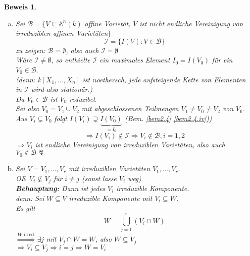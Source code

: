 \documentclass[a4paper,12pt]{report}
\theoremstyle{break}
\theoremstyle{nonumberbreak}
\newtheorem{Bew}{Beweis}
\theoremstyle{nonumberplain}
\newcommand{\A}{\mathbb{A}}
\renewcommand{\OE}{O\!\!E~}
\begin{document}
\begin{Bew}\begin{enumerate}[a)]
\item
Sei $\mathcal B=\{V\subseteq \A ^n(k)$ affine Variet\"at, $V$ ist \emph{nicht} endliche Vereinigung von irreduziblen affinen Variet\"aten$\}$
\[\mathcal I =\{I(V) : V\in \mathcal B\}\]
\emph{zu zeigen:} $\mathcal B = \emptyset$, also auch $\mathcal I = \emptyset$\\
W\"are $\mathcal I \neq \emptyset$, so enthielte $\mathcal I$ ein maximales Element $I_0=I(V_0)$ f\"ur ein $V_0\in \mathcal B$.\\
(\emph{denn:} $k[X_1,\dots ,X_n]$ ist noethersch, jede aufsteigende Kette von Elementen in $\mathcal I$ wird also station\"ar.)\\
Da $V_0\in \mathcal B$ ist $V_0$ reduzibel.\\
Sei also $V_0=V_1\cup V_2$ mit abgeschlossenen Teilmengen $V_1\neq V_0 \neq V_2$ von $V_0$.\\
Aus $V_i\subsetneq V_0$ folgt $I(V_i)\supsetneq\underbrace{I(V_0)}_{=I_0}$ (Bem. \ref{bem2.4} \ref{bem2.4.iv}))
\[\Rightarrow I(V_i)\notin \mathcal I \Rightarrow V_i\notin \mathcal B, i=1,2\]
$\Rightarrow V_i$ ist endliche Vereinigung von irreduziblen Variet\"aten, also auch $V_0 \notin \mathcal B \lightning$

\item
Sei $V=V_1,\dots ,V_r$ mit irreduziblen Variet\"aten $V_1,\dots ,V_r$.\\
\OE $V_i\nsubseteq V_j$ f\"ur $i\neq j$ (sonst lasse $V_i$ weg)\\
\textbf{Behauptung:} Dann ist jedes $V_i$ irreduzible Komponente.\\
\emph{denn:} Sei $W \subseteq V$ irreduzible Komponente mit $V_i\subseteq W$.\\
Es gilt \[W = \bigcup_{j=1}^r (V_i \cap W)\]
$\overset{W \textrm{ irred.}}{\Longrightarrow} \exists j$ mit $V_j \cap W=W$, also $W\subseteq V_j$\\
$\Rightarrow V_i\subseteq V_j \Rightarrow i=j\Rightarrow W=V_i$\end{enumerate}\end{Bew}
\end{document}
